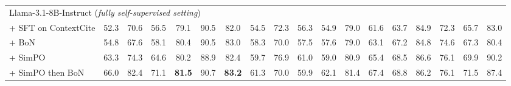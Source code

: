 \begin{table*}[t]
{\begin{tabular}{l|ccc|ccc|ccc|ccc|ccc|c|c}
			\midrule
			\multicolumn{18}{l}{Llama-3.1-8B-Instruct (\textit{fully self-supervised setting})}                                                                                                                                                                                                                                                                                                         \\
			+ SFT on ContextCite             & 52.3                                    & 70.6                                  & 56.5                              & 79.1                              & 90.5                               & 82.0     & 54.5         & 72.3 & 56.3 & 54.9 & 79.0 & 61.6 & 63.7 & 84.9 & 72.3 & 65.7   & 83.0       \\
			\hspace{4mm} + BoN               & 54.8                                    & 67.6                                  & 58.1                              & 80.4                              & 90.5                               & 83.0     & 58.3         & 70.0 & 57.5 & 57.6 & 79.0 & 63.1 & 67.2 & 84.8 & 74.6 & 67.3   & 80.4       \\
			\hspace{4mm} + SimPO             & 63.3                                    & 74.3                                  & 64.6                              & 80.2                              & 88.9                               & 82.4     & 59.7         & 76.9 & 61.0 & 59.0 & 80.9 & 65.4 & 68.5 & 86.6 & 76.1 & 69.9   & 90.2       \\
			\hspace{4mm} + SimPO then BoN    & 66.0                                    & 82.4                                  & 71.1                              & \bf 81.5                          & 90.7                               & \bf 83.2 & 61.3         & 70.0 & 59.9 & 62.1 & 81.4 & 67.4 & 68.8 & 86.2 & 76.1 & 71.5   & 87.4       \\
			\bottomrule
		\end{tabular}
	}
\end{table*}